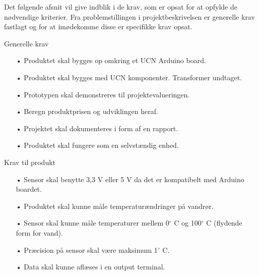 Det følgende afsnit vil give indblik i de krav, som er opsat for at opfylde de nødvendige kriterier. Fra problemstillingen i projektbeskrivelsen er generelle krav fastlagt og for at imødekomme disse er specifikke krav opsat.  

\hfill \break
Generelle krav
\begin{enumerate}
	\item[•]Produktet skal bygges op omkring et UCN Arduino board. 
	\item[•]Produktet skal bygges med UCN komponenter. Transformer undtaget.
	\item[•]Prototypen skal demonstreres til projektevalueringen. 
	\item[•]Beregn produktprisen og udviklingen heraf.
	\item[•]Projektet skal dokumenteres i form af en rapport.
	\item[•]Produktet skal fungere som en selvstændig enhed.
\end{enumerate}	

Krav til produkt
\begin{enumerate}
	\item[•]Sensor skal benytte 3,3 V eller 5 V da det er kompatibelt med Arduino boardet.
	\item[•]Produktet skal kunne måle temperaturændringer på vandrør.
	\item[•]Sensor skal kunne måle temperaturer mellem 0$^{\circ}$ C og 100$^{\circ}$ C (flydende form for vand).
	\item[•]Præcision på sensor skal være maksimum 1$^{\circ}$ C.
	\item[•]Data skal kunne aflæses i en output terminal.
\end{enumerate}	
	